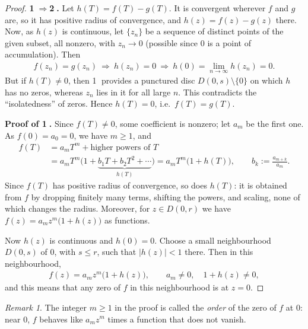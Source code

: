\documentclass[11pt]{article}
\theoremstyle{plain}
\theoremstyle{definition}
\theoremstyle{remark}
\newtheorem*{remark}{Remark}
\numberwithin{equation}{section}
\newcommand{\be}{\begin{eqnarray}}
\newcommand{\ee}{\end{eqnarray}}
\begin{document}
\begin{proof}
\textbf{\textcircled{\scriptsize1}$\Rightarrow$\textcircled{\scriptsize2}.}
Let $h(T)=f(T)-g(T)$. It is convergent wherever $f$ and $g$ are, so it has
positive radius of convergence, and $h(z)=f(z)-g(z)$ there. Now, as $h(z)$
is continuous, let $\{z_n\}$ be a sequence of distinct points of the given
subset, all nonzero, with $z_n\to0$ (possible since $0$ is a point of
accumulation). Then
\be
 f(z_n)=g(z_n)\ \Longrightarrow\ h(z_n)=0
 \ \Longrightarrow\ h(0)=\lim_{n\to\infty}h(z_n)=0.
\ee
But if $h(T)\neq0$, then \textcircled{\scriptsize1} provides a punctured
disc $D(0,s)\setminus\{0\}$ on which $h$ has no zeros, whereas $z_n$ lies in
it for all large $n$. This contradicts the ``isolatedness'' of zeros. Hence
$h(T)=0$, i.e.\ $f(T)=g(T)$.

\textbf{Proof of \textcircled{\scriptsize1}.} Since $f(T)\neq0$, some
coefficient is nonzero; let $a_m$ be the first one. As $f(0)=a_0=0$, we have
$m\geq1$, and
\begin{align*}
 f(T)&=a_mT^m+\text{higher powers of }T\\
 &=a_mT^m\bigl(1+\underbrace{b_1T+b_2T^2+\cdots}_{h(T)}\bigr)
 =a_mT^m\bigl(1+h(T)\bigr),
 \qquad b_k:=\frac{a_{m+k}}{a_m}.
\end{align*}
Since $f(T)$ has positive radius of convergence, so does $h(T)$: it is
obtained from $f$ by dropping finitely many terms, shifting the powers, and
scaling, none of which changes the radius. Moreover, for $z\in D(0,r)$ we have
$f(z)=a_mz^m\bigl(1+h(z)\bigr)$ as functions.

Now $h(z)$ is continuous and $h(0)=0$. Choose a small neighbourhood
$D(0,s)$ of $0$, with $s\leq r$, such that $|h(z)|<1$ there. Then in this
neighbourhood,
\be
 f(z)=a_mz^m\bigl(1+h(z)\bigr),\qquad a_m\neq0,\quad 1+h(z)\neq0,
\ee
and this means that any zero of $f$ in this neighbourhood is at $z=0$.
\end{proof}

\begin{remark}
The integer $m\geq1$ in the proof is called the \emph{order} of the zero of
$f$ at $0$: near $0$, $f$ behaves like $a_mz^m$ times a function that does
not vanish.
\end{remark}
\end{document}
